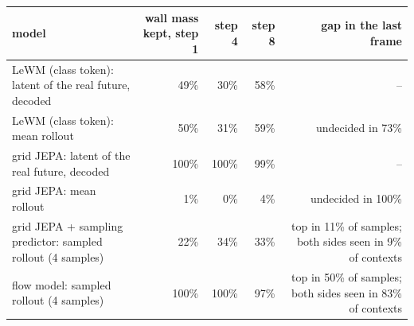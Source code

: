 \begin{tabular}{lrrrr}
\toprule
model & wall mass kept, step 1 & step 4 & step 8 & gap in the last frame \\
\midrule
LeWM (class token): latent of the real future, decoded & 49\% & 30\% & 58\% & -- \\
LeWM (class token): mean rollout & 50\% & 31\% & 59\% & undecided in 73\% \\
grid JEPA: latent of the real future, decoded & 100\% & 100\% & 99\% & -- \\
grid JEPA: mean rollout & 1\% & 0\% & 4\% & undecided in 100\% \\
grid JEPA + sampling predictor: sampled rollout (4 samples) & 22\% & 34\% & 33\% & top in 11\% of samples; both sides seen in 9\% of contexts \\
flow model: sampled rollout (4 samples) & 100\% & 100\% & 97\% & top in 50\% of samples; both sides seen in 83\% of contexts \\
\bottomrule
\end{tabular}
